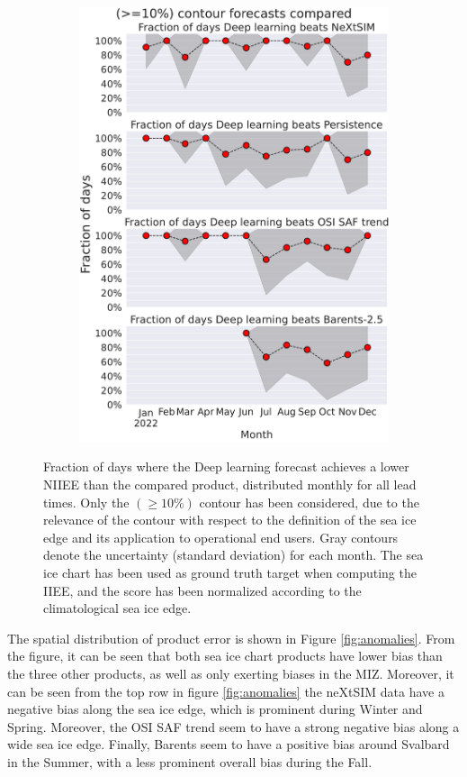 \documentclass[../main/thesis.tex]{subfiles}
\begin{document}
\begin{figure}
\begin{subfigure}{0.32\textwidth}
        \includegraphics[width=\textwidth]{days_beat_weights_09031047.pdf}
    \end{subfigure}
    \caption{\label{fig:days-beat}Fraction of days where the Deep learning forecast achieves a lower NIIEE than the compared product, distributed monthly for all lead times. Only the $(\geq10\%)$ contour has been considered, due to the relevance of the contour with respect to the definition of the sea ice edge and its application to operational end users. Gray contours denote the uncertainty (standard deviation) for each month. The sea ice chart has been used as ground truth target when computing the IIEE, and the score has been normalized according to the climatological sea ice edge.}
\end{figure}

The spatial distribution of product error is shown in Figure \ref{fig:anomalies}. From the figure, it can be seen that both sea ice chart products have lower bias than the three other products, as well as only exerting biases in the MIZ. Moreover, it can be seen from the top row in figure \ref{fig:anomalies} the neXtSIM data have a negative bias along the sea ice edge, which is prominent during Winter and Spring. Moreover, the OSI SAF trend seem to have a strong negative bias along a wide sea ice edge. Finally, Barents seem to have a positive bias around Svalbard in the Summer, with a less prominent overall bias during the Fall.
\end{document}
